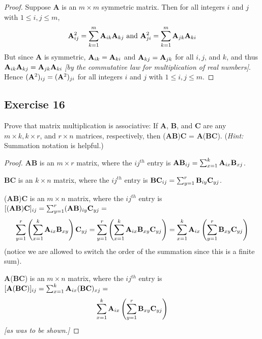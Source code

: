 \documentclass[14pt]{extarticle}
\begin{document}
\begin{proof}
    Suppose {\bf A} is an \(m \times m\) symmetric matrix. Then for all integers \(i\) and \(j\) with \(1 \leq i, j \leq m\),
    \[
        {\bf A}^2_{ij} = \sum_{k=1}^{m} {\bf A}_{ik} {\bf A}_{kj} \text{ and } {\bf A}^2_{ji} = \sum_{k=1}^{m} {\bf A}_{jk} {\bf A}_{ki}
    \]
    But since {\bf A} is symmetric, \({\bf A}_{ik} = {\bf A}_{ki}\) and \({\bf A}_{kj} = {\bf A}_{jk}\) for all \(i, j\), and \(k\), and thus \({\bf A}_{ik}
    {\bf A}_{kj} = {\bf A}_{jk} {\bf A}_{ki}\) {\it [by the commutative law for multiplication of real numbers]}. Hence \(({\bf A}^2)_{ij} =
    ({\bf A}^2)_{ji}\) for all integers \(i\) and \(j\) with \(1 \leq i, j \leq m\).
\end{proof}

\subsection{Exercise 16}
Prove that matrix multiplication is associative: If {\bf A}, {\bf B}, and {\bf C} are any \(m \times k, k \times r\), and
\(r \times n\) matrices, respectively, then ({\bf A}{\bf B}){\bf C} = {\bf A}({\bf B}{\bf C}).
({\it Hint:} Summation notation is helpful.)

\begin{proof}
    {\bf A}{\bf B} is an \(m \times r\) matrix, where the \(ij^{th}\) entry is \({\bf A}{\bf B}_{ij} = \sum_{x=1}^{k}{\bf A}_{ix}{\bf B}_{xj}\).

        {\bf B}{\bf C} is an \(k \times n\) matrix, where the \(ij^{th}\) entry is \({\bf B}{\bf C}_{ij} = \sum_{y=1}^{r}{\bf B}_{iy}{\bf C}_{yj}\).

    ({\bf A}{\bf B}){\bf C} is an \(m \times n\) matrix, where the \(ij^{th}\) entry is \([({\bf A}{\bf B}){\bf C}]_{ij} =
    \sum_{y=1}^{r} ({\bf A}{\bf B})_{iy}{\bf C}_{yj} = \)
    \[
        \sum_{y=1}^{r} \left(\sum_{x=1}^{k}{\bf A}_{ix}{\bf B}_{xy}\right) {\bf C}_{yj}
        = \sum_{y=1}^{r}\left(\sum_{x=1}^{k}{\bf A}_{ix}{\bf B}_{xy} {\bf C}_{yj}\right)
        = \sum_{x=1}^{k}{\bf A}_{ix}\left(\sum_{y=1}^{r}{\bf B}_{xy} {\bf C}_{yj}\right)
    \]
    (notice we are allowed to switch the order of the summation since this is a finite sum).

        {{\bf A}({\bf B}{\bf C})} is an \(m \times n\) matrix, where the \(ij^{th}\) entry is \([{\bf A}({\bf B}{\bf C})]_{ij} =
    \sum_{x=1}^{k} {\bf A}_{ix}({\bf B}{\bf C})_{xj}= \)
    \[
        \sum_{x=1}^{k}{\bf A}_{ix}\left(\sum_{y=1}^{r}{\bf B}_{xy}{\bf C}_{yj}\right)
    \]
    {\it [as was to be shown.]}
\end{proof}
\end{document}
